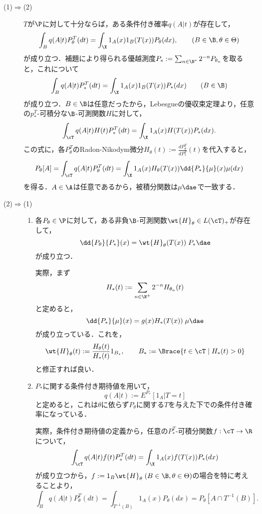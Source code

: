 \documentclass[uplatex,dvipdfmx]{jsreport}
\begin{document}
\begin{Proof}\mbox{}
    \begin{description}
        \item[(1)$\Rightarrow$(2)] $T$が$\P$に対して十分ならば，ある条件付き確率$q(A|t)$が存在して，
        \[\int_Bq(A|t)P^T_\theta(dt)=\int_\X 1_A(x)1_B(T(x))P_\theta(dx),\qquad(B\in\B,\theta\in\Theta)\]
        が成り立つ．補題により得られる優越測度$P_*:=\sum_{n\in\N^*}2^{-n}P_{\theta_n}$を取ると，これについて
        \[\int_Bq(A|t)P^T_*(dt)=\int_\X 1_A(x)1_B(T(x))P_*(dx)\qquad(B\in\B)\]
        が成り立つ．$B\in\B$は任意だったから，Lebesgueの優収束定理より，任意の$p^T_*$-可積分な$\B$-可測関数$H$に対して，
        \[\int_\cT q(A|t)H(t)P^T_*(dt)=\int_\X 1_A(x)H(T(x))P_*(dx).\]
        この式に，各$P_\theta^T$のRadon-Nikodym微分$H_\theta(t):=\frac{dP_\theta^T}{dP_*^T}(t)$を代入すると，
        \[P_\theta[A]=\int_\cT q(A|t)P^T_\theta(dt)=\int_\X 1_A(x)H_\theta(T(x))\dd{P_*}{\mu}(x)\mu(dx)\]
        を得る．$A\in\A$は任意であるから，被積分関数は$\mu\dae$で一致する．
        \item[(2)$\Rightarrow$(1)] \begin{enumerate}[{Step}1]
            \item 各$P_\theta\in\P$に対して，ある非負$\B$-可測関数$\wt{H}_\theta\in L(\cT)_+$が存在して，
            \[\dd{P_\theta}{P_*}(x)=\wt{H}_\theta(T(x))\;P_*\dae\]
            が成り立つ．

            実際，まず
            \[H_*(t):=\sum_{n\in\N^+}2^{-n}H_{\theta_n}(t)\]
            と定めると，
            \[\dd{P_*}{\mu}(x)=g(x)H_*(T(x))\;\mu\dae\]
            が成り立っている．これを，
            \[\wt{H}_\theta(t):=\frac{H_\theta(t)}{H_*(t)}1_{B_*},\qquad B_*:=\Brace{t\in\cT\mid H_*(t)>0}\]
            と修正すれば良い．
            \item $P_*$に関する条件付き期待値を用いて，
            \[q(A|t):=E^{P_*}[1_A|T=t]\]
            と定めると，これは$\theta$に依らず$P_\theta$に関する$T$を与えた下での条件付き確率になっている．

            実際，条件付き期待値の定義から，任意の$P_*^T$-可積分関数$f:\cT\to\R$について，
            \[\int_\cT q(A|t)f(t)P^T_*(dt)=\int_\X 1_A(x)f(T(x))P_*(dx)\]
            が成り立つから，$f:=1_B\wt{H}_\theta\;(B\in\B,\theta\in\Theta)$の場合を特に考えることより，
            \[\int_Bq(A|t)P^T_\theta(dt)=\int_{T^{-1}(B)}1_A(x)P_\theta(dx)=P_\theta[A\cap T^{-1}(B)].\]
        \end{enumerate}
    \end{description}
\end{Proof}
\end{document}
